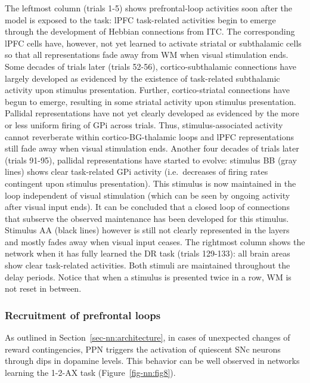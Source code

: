 \documentclass[
  11pt,
  a4paper,
]{scrbook}
\begin{document}
The leftmost column (trials 1-5) shows prefrontal-loop activities soon
after the model is exposed to the task: lPFC task-related activities
begin to emerge through the development of Hebbian connections from ITC.
The corresponding lPFC cells have, however, not yet learned to activate
striatal or subthalamic cells so that all representations fade away from
WM when visual stimulation ends. Some decades of trials later (trials
52-56), cortico-subthalamic connections have largely developed as
evidenced by the existence of task-related subthalamic activity upon
stimulus presentation. Further, cortico-striatal connections have begun
to emerge, resulting in some striatal activity upon stimulus
presentation. Pallidal representations have not yet clearly developed as
evidenced by the more or less uniform firing of GPi across trials. Thus,
stimulus-associated activity cannot reverberate within
cortico-BG-thalamic loops and lPFC representations still fade away when
visual stimulation ends. Another four decades of trials later (trials
91-95), pallidal representations have started to evolve: stimulus BB
(gray lines) shows clear task-related GPi activity (i.e.~decreases of
firing rates contingent upon stimulus presentation). This stimulus is
now maintained in the loop independent of visual stimulation (which can
be seen by ongoing activity after visual input ends). It can be
concluded that a closed loop of connections that subserve the observed
maintenance has been developed for this stimulus. Stimulus AA (black
lines) however is still not clearly represented in the layers and mostly
fades away when visual input ceases. The rightmost column shows the
network when it has fully learned the DR task (trials 129-133): all
brain areas show clear task-related activities. Both stimuli are
maintained throughout the delay periods. Notice that when a stimulus is
presented twice in a row, WM is not reset in between.

\subsubsection*{Recruitment of prefrontal
loops}\label{recruitment-of-prefrontal-loops}

As outlined in Section~\ref{sec-nn:architecture}, in cases of unexpected
changes of reward contingencies, PPN triggers the activation of
quiescent SNc neurons through dips in dopamine levels. This behavior can
be well observed in networks learning the 1-2-AX task
(Figure~\ref{fig-nn:fig8}).
\end{document}
